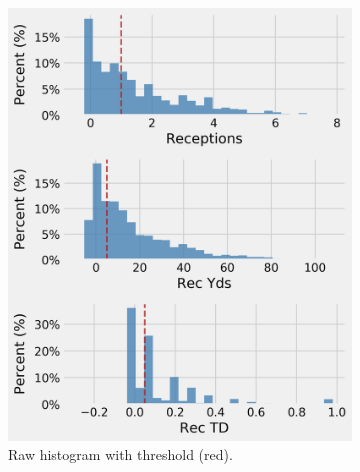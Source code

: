 \documentclass[12pt]{article}
\begin{document}
\pagebreak
\begin{figure}[H]
  \centering
  \begin{subfigure}[b]{0.450\textwidth}
    \centering
    \includegraphics[width=1\textwidth]{../figures/no_threshold_hist_TE}
    \caption{Raw histogram with threshold (red).}
  \end{subfigure}
  \hfill
  \begin{subfigure}[b]{0.450\textwidth}
    \centering

\end{subfigure}
\end{figure}
\end{document}
